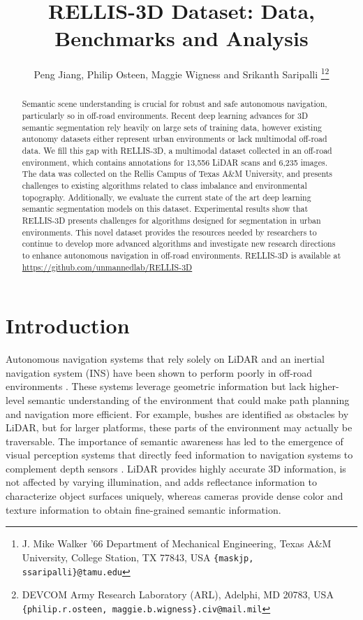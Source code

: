 \documentclass[letterpaper, 10 pt, conference]{ieeeconf}
\title{\LARGE \bf
RELLIS-3D Dataset: Data, Benchmarks and Analysis
}
\author{Peng Jiang, Philip Osteen, Maggie Wigness and Srikanth Saripalli
\thanks{J. Mike Walker '66 Department of Mechanical Engineering, 
Texas A\&M University, College Station, TX 77843, USA
        {\tt\small \{maskjp, ssaripalli\}@tamu.edu}}\thanks{DEVCOM Army Research Laboratory (ARL), Adelphi, MD 20783, USA
        {\tt\small \{philip.r.osteen, maggie.b.wigness\}.civ@mail.mil}}}
\begin{document}
\maketitle
\thispagestyle{empty}
\pagestyle{empty}


\begin{abstract}
Semantic scene understanding is crucial for robust and safe autonomous navigation, particularly so in off-road environments. Recent deep learning advances for 3D semantic segmentation rely heavily on large sets of training data, however existing autonomy datasets either represent urban environments or lack multimodal off-road data. We fill this gap with RELLIS-3D, a multimodal dataset collected in an off-road environment, which contains annotations for 13,556 LiDAR scans and 6,235 images. The data was collected on the Rellis Campus of Texas A\&M University, and presents challenges to existing algorithms related to class imbalance and environmental topography. Additionally, we evaluate the current state of the art deep learning semantic segmentation models on this dataset. Experimental results show that RELLIS-3D presents challenges for algorithms designed for segmentation in urban environments. This novel dataset provides the resources needed by researchers to continue to develop more advanced algorithms and investigate new research directions to enhance autonomous navigation in off-road environments. RELLIS-3D is available at \url{https://github.com/unmannedlab/RELLIS-3D}
\end{abstract} 

\section{Introduction}
Autonomous navigation systems that rely solely on LiDAR and an inertial navigation system (INS) have been shown to perform poorly in off-road environments \cite{Maturana2018, Jackel2006, Thrun2006}. These systems leverage geometric information but lack higher-level semantic understanding of the environment that could make path planning and navigation more efficient. For example, bushes are identified as obstacles by LiDAR, but for larger platforms, these parts of the environment may actually be traversable. The importance of semantic awareness has led to the emergence of visual perception systems that directly feed information to navigation systems to complement depth sensors \cite{Maturana2018, Hussein2016, Huertas2005, Manduchi2005, Yang2020}. LiDAR provides highly accurate 3D information, is not affected by varying illumination, and adds reflectance information to characterize object surfaces uniquely, whereas cameras provide dense color and texture information to obtain fine-grained semantic information.
\end{document}
